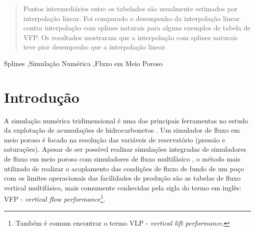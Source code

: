 \documentclass[final,5p]{elsarticle}
\numberwithin{equation}{section}
\begin{document}
\begin{frontmatter}
\begin{abstract}
    Pontos intermediários entre os tabelados são usualmente estimados por interpolação linear. Foi comparado o desempenho da interpolação linear contra interpolação com splines naturais para alguns exemplos de tabela de VFP. Os resultados mostraram que a interpolação com splines naturais teve pior desempenho que a interpolação linear. 

\end{abstract}




\begin{keyword}
    Splines \sep Simulação Numérica \sep Fluxo em Meio Poroso



\end{keyword}

\end{frontmatter}


\section{Introdução}

    A simulação numérica tridimensional é uma das principais ferramentas no estudo da explotação de acumulações de hidrocarbonetos \cite{ReservoirSimulationErtekin}. Um simulador de fluxo em meio poroso é focado na resolução das variáveis de reservatório (pressão e saturações). Apesar de ser possível realizar simulações integradas de simuladores de fluxo em meio poroso com simuladores de fluxo multifásico \cite{10.2118/195477-MS}, o método mais utilizado de realizar o acoplamento das condições de fluxo de fundo de um poço com os limites operacionais das facilidades de produção são as tabelas de fluxo vertical multifásico, mais comumente conhecidas pela sigla do termo em inglês: VFP - \emph{vertical flow performance}\footnote{Também é comum encontrar o termo VLP - \emph{vertical lift performance}.}.
\end{document}
